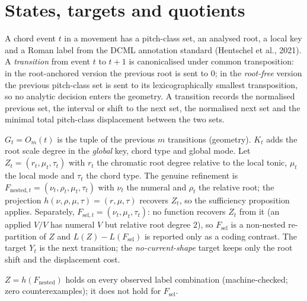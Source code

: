 \documentclass[11pt]{article}
\begin{document}
\section{States, targets and quotients}
A chord event $t$ in a movement has a pitch-class set, an analysed root, a local key and a Roman label from the DCML annotation standard (Hentschel et al., 2021). A \emph{transition} from event $t$ to $t{+}1$ is canonicalised under common transposition: in the root-anchored version the previous root is sent to $0$; in the \emph{root-free} version the previous pitch-class set is sent to its lexicographically smallest transposition, so no analytic decision enters the geometry. A transition records the normalised previous set, the interval or shift to the next set, the normalised next set and the minimal total pitch-class displacement between the two sets.
\begin{definition}[contexts]
$G_t=O_m(t)$ is the tuple of the previous $m$ transitions (geometry). $K_t$ adds the root scale degree in the \emph{global} key, chord type and global mode. Let $Z_t=(r_t,\mu_t,\tau_t)$ with $r_t$ the chromatic root degree relative to the local tonic, $\mu_t$ the local mode and $\tau_t$ the chord type. The genuine refinement is $F_{\mathrm{nested},t}=(\nu_t,\rho_t,\mu_t,\tau_t)$ with $\nu_t$ the numeral and $\rho_t$ the relative root; the projection $h(\nu,\rho,\mu,\tau)=(r,\mu,\tau)$ recovers $Z_t$, so the sufficiency proposition applies. Separately, $F_{\mathrm{sel},t}=(\nu_t,\mu_t,\tau_t)$: no function recovers $Z_t$ from it (an applied $V/V$ has numeral $V$ but relative root degree $2$), so $F_{\mathrm{sel}}$ is a non-nested re-partition of $Z$ and $L(Z)-L(F_{\mathrm{sel}})$ is reported only as a coding contrast. The target $Y_t$ is the next transition; the \emph{no-current-shape} target keeps only the root shift and the displacement cost.
\end{definition}
$Z=h(F_{\mathrm{nested}})$ holds on every observed label combination (machine-checked; zero counterexamples); it does not hold for $F_{\mathrm{sel}}$.
\end{document}
